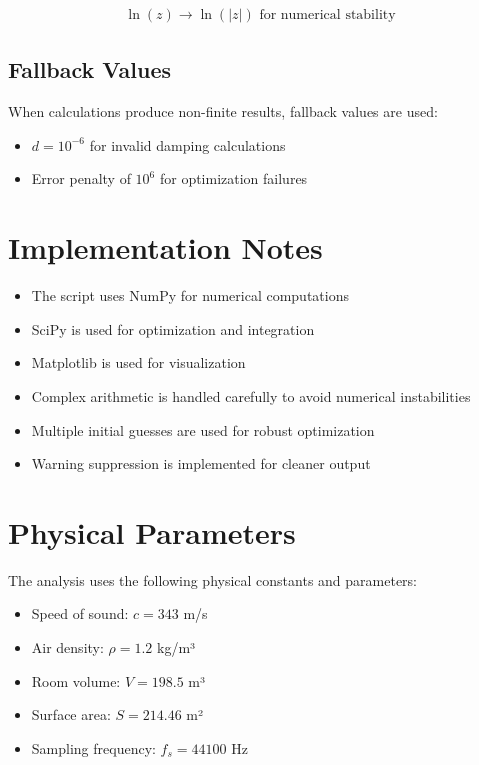 \documentclass{article}
\begin{document}
\begin{align}
\ln(z) \rightarrow \ln(|z|) \text{ for numerical stability}
\end{align}

\subsection{Fallback Values}
When calculations produce non-finite results, fallback values are used:
\begin{itemize}
    \item $d = 10^{-6}$ for invalid damping calculations
    \item Error penalty of $10^6$ for optimization failures
\end{itemize}

\section{Implementation Notes}

\begin{itemize}
    \item The script uses NumPy for numerical computations
    \item SciPy is used for optimization and integration
    \item Matplotlib is used for visualization
    \item Complex arithmetic is handled carefully to avoid numerical instabilities
    \item Multiple initial guesses are used for robust optimization
    \item Warning suppression is implemented for cleaner output
\end{itemize}

\section{Physical Parameters}

The analysis uses the following physical constants and parameters:
\begin{itemize}
    \item Speed of sound: $c = 343$ m/s
    \item Air density: $\rho = 1.2$ kg/m³
    \item Room volume: $V = 198.5$ m³
    \item Surface area: $S = 214.46$ m²
    \item Sampling frequency: $f_s = 44100$ Hz
\end{itemize}
\end{document}

